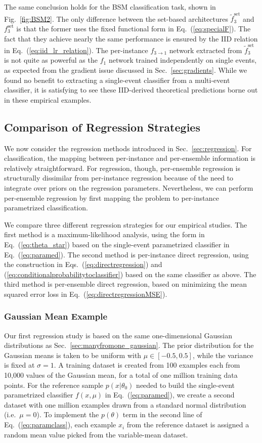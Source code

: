 \documentclass[aps,prx,reprint,preprintnumbers,superscriptaddress,nofootinbib,longbibliography,floatfix]{revtex4-2}
\DeclareRobustCommand{\Sec}[1]{Sec.~\ref{sec:#1}}
\DeclareRobustCommand{\Fig}[1]{Fig.~\ref{fig:#1}}
\DeclareRobustCommand{\Eq}[1]{Eq.~(\ref{eq:#1})}
\DeclareRobustCommand{\Eqs}[2]{Eqs.~(\ref{eq:#1}) and (\ref{eq:#2})}
\begin{document}
The same conclusion holds for the BSM classification task, shown in \Fig{BSM2}.
%
The only difference between the set-based architectures $\tilde{f}_3^\text{set}$ and $f_3^\text{set}$ is that the former uses the fixed functional form in \Eq{specialF}.
%
The fact that they achieve nearly the same performance is ensured by the IID relation in \Eq{iid_lr_relation}.
%
The per-instance $f_{3\rightarrow 1}$ network extracted from $\tilde{f}_3^\text{set}$ is not quite as powerful as the $f_{1}$ network trained independently on single events, as expected from the gradient issue discussed in \Sec{gradients}.
%
While we found no benefit to extracting a single-event classifier from a multi-event classifier, it is satisfying to see these IID-derived theoretical predictions  borne out in these empirical examples.

 
\subsection{Comparison of Regression Strategies}
\label{sec:regression_study}

We now consider the regression methods introduced in \Sec{regression}.
%
For classification, the mapping between per-instance and per-ensemble information is relatively straightforward.
%
For regression, though, per-ensemble regression is structurally dissimilar from per-instance regression because of the need to integrate over priors on the regression parameters.
%
Nevertheless, we can perform per-ensemble regression by first mapping the problem to per-instance parametrized classification.


We compare three different regression strategies for our empirical studies.
%
The first method is a maximum-likelihood analysis, using the form in \Eq{theta_star} based on the single-event parametrized classifier in \Eq{paramed}.
%
The second method is per-instance direct regression, using the construction in \Eqs{directregression}{conditionalprobabilitytoclassifier} based on the same classifier as above.
%
The third method is per-ensemble direct regression, based on minimizing the mean squared error loss in \Eq{directregressionMSE}.


\subsubsection{Gaussian Mean Example}


Our first regression study is based on the same one-dimensional Gaussian distributions as \Sec{manyfromone_gaussian}.
%
The prior distribution for the Gaussian means is taken to be uniform with $\mu \in [-0.5,0.5]$, while the variance is fixed at $\sigma = 1$.
%
A training dataset is created from 100 examples each from 10,000 values of the Gaussian mean, for a total of one million training data points.
%
For the reference sample $p(x|\theta_0)$ needed to build the single-event parametrized classifier $f(x,\mu)$ in \Eq{paramed}, we create a second dataset with one million examples drawn from a standard normal distribution (i.e.\ $\mu  = 0$).
%
To implement the $p(\theta)$ term in the second line of \Eq{paramclass}, each example $x_i$ from the reference dataset is assigned a random mean value picked from the variable-mean dataset.
\end{document}
